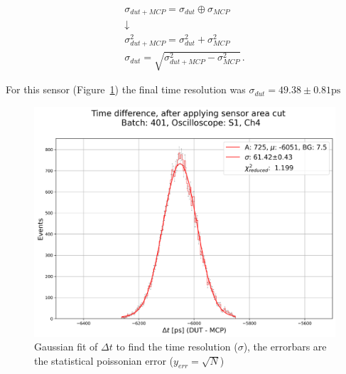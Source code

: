 \begin{equation*}
    \begin{gathered}
    \sigma_{dut+MCP} = \sigma_{dut} \oplus \sigma_{MCP} \\
    \downarrow \\
    \sigma_{dut+MCP}^2 = \sigma_{dut}^2 + \sigma_{MCP}^2 \\
    \sigma_{dut} = \sqrt{\sigma_{dut+MCP}^2-\sigma_{MCP}^2}  \, .
    \end{gathered}
\end{equation*}

For this sensor (Figure~\ref{fig:time_resolution_plot}) the final time resolution was \(\sigma_{dut} = 49.38\pm0.81\si{\ps} \)

\begin{figure}[!ht]
    \centering
    \includegraphics[width=0.7\linewidth]{Images/time_resolution_plots/time_difference_401_S1_zoomed_and_gauss_fit_with_cuts_central_area_DUTs_3.png}
    \captionsetup{width=\captionwidth}
    \caption{Gaussian fit of $\Delta t$ to find the time resolution ($\sigma$), the errorbars are the statistical poissonian error ($y_{err}=\sqrt{N}$)}
    \label{fig:time_resolution_plot}
\end{figure}


